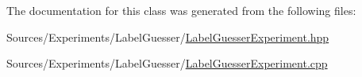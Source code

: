 The documentation for this class was generated from the following files\+:\begin{DoxyCompactItemize}
\item 
Sources/\+Experiments/\+Label\+Guesser/\hyperlink{_label_guesser_experiment_8hpp}{Label\+Guesser\+Experiment.\+hpp}\item 
Sources/\+Experiments/\+Label\+Guesser/\hyperlink{_label_guesser_experiment_8cpp}{Label\+Guesser\+Experiment.\+cpp}\end{DoxyCompactItemize}
